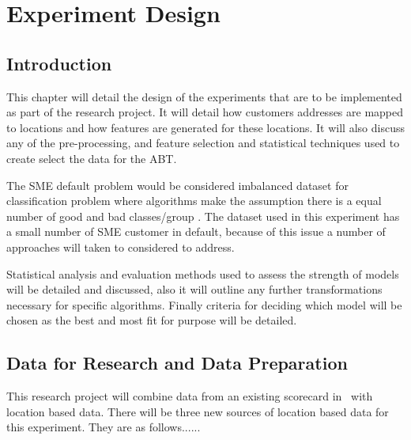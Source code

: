 
\chapter{Experiment Design} %

\label{Chapter3} %


\section{Introduction}

This chapter will detail the design of the experiments that are to be implemented as part of the research project. It will detail how customers addresses are mapped to locations and how features are generated for these locations. It will also discuss any of the pre-processing, and feature selection and statistical techniques used to create select the data for the ABT.

The SME default problem would be considered imbalanced dataset for classification problem where algorithms make the assumption there is a equal number of good and bad classes/group \citep{japkowicz_class_2000}. The dataset used in this experiment has a small number of SME customer in default, because of this issue a number of approaches will taken to considered to address.

Statistical analysis and evaluation methods used to assess the strength of models will be detailed and discussed, also it will outline any further transformations necessary for specific algorithms. Finally criteria for deciding which model will be chosen as the best and most fit for purpose will be detailed.

\section{Data for Research and Data Preparation}
This research project will combine data from an existing scorecard in \subjectname\ with location based data. There will be three new sources of location based data for this experiment. They are as follows......

